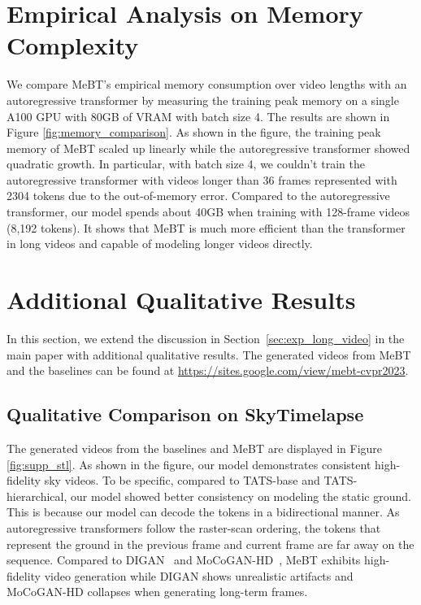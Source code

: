 \documentclass[10pt,twocolumn,letterpaper]{article}
\begin{document}
\section{Empirical Analysis on Memory Complexity}
\label{appx:empirical_mem}
We compare MeBT's empirical memory consumption over video lengths with an autoregressive transformer by measuring the training peak memory on a single A100 GPU with 80GB of VRAM with batch size 4. The results are shown in Figure \ref{fig:memory_comparison}. As shown in the figure, the training peak memory of MeBT scaled up linearly while the autoregressive transformer \cite{TATS} showed quadratic growth. In particular, with batch size 4, we couldn't train the autoregressive transformer with videos longer than 36 frames represented with 2304 tokens due to the out-of-memory error. Compared to the autoregressive transformer, our model spends about 40GB when training with 128-frame videos (8,192 tokens). It shows that MeBT is much more efficient than the transformer in long videos and capable of modeling longer videos directly.

\section{Additional Qualitative Results}
\label{appx:qualitative}
In this section, we extend the discussion in Section~\ref{sec:exp_long_video} in the main paper with additional qualitative results.
The generated videos from MeBT and the baselines can be found at \href{https://sites.google.com/view/mebt-cvpr2023}{https://sites.google.com/view/mebt-cvpr2023}.
\subsection{Qualitative Comparison on SkyTimelapse}
The generated videos from the baselines and MeBT are displayed in Figure \ref{fig:supp_stl}. As shown in the figure, our model demonstrates consistent high-fidelity sky videos. To be specific, compared to TATS-base and TATS-hierarchical, our model showed better consistency on modeling the static ground. This is because our model can decode the tokens in a bidirectional manner. As autoregressive transformers follow the raster-scan ordering, the tokens that represent the ground in the previous frame and current frame are far away on the sequence. Compared to DIGAN~\cite{DIGAN} and MoCoGAN-HD~\cite{MoCoGAN-HD}, MeBT exhibits high-fidelity video generation while DIGAN shows unrealistic artifacts and MoCoGAN-HD collapses when generating long-term frames.
\end{document}
